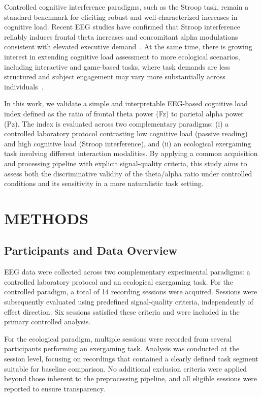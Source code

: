 \documentclass[letterpaper, 10 pt, conference]{ieeeconf}
\begin{document}
Controlled cognitive interference paradigms, such as the Stroop task, remain a standard benchmark for eliciting robust and well-characterized increases in cognitive load. Recent EEG studies have confirmed that Stroop interference reliably induces frontal theta increases and concomitant alpha modulations consistent with elevated executive demand~\cite{c5,c9}. At the same time, there is growing interest in extending cognitive load assessment to more ecological scenarios, including interactive and game-based tasks, where task demands are less structured and subject engagement may vary more substantially across individuals~\cite{c2,c3}.

In this work, we validate a simple and interpretable EEG-based cognitive load index defined as the ratio of frontal theta power (Fz) to parietal alpha power (Pz). The index is evaluated across two complementary paradigms: (i) a controlled laboratory protocol contrasting low cognitive load (passive reading) and high cognitive load (Stroop interference), and (ii) an ecological exergaming task involving different interaction modalities. By applying a common acquisition and processing pipeline with explicit signal-quality criteria, this study aims to assess both the discriminative validity of the theta/alpha ratio under controlled conditions and its sensitivity in a more naturalistic task setting.



\section{METHODS}

\subsection{Participants and Data Overview}
EEG data were collected across two complementary experimental paradigms: a controlled laboratory protocol and an ecological exergaming task. For the controlled paradigm, a total of 14 recording sessions were acquired. Sessions were subsequently evaluated using predefined signal-quality criteria, independently of effect direction. Six sessions satisfied these criteria and were included in the primary controlled analysis. 

For the ecological paradigm, multiple sessions were recorded from several participants performing an exergaming task. Analysis was conducted at the session level, focusing on recordings that contained a clearly defined task segment suitable for baseline comparison. No additional exclusion criteria were applied beyond those inherent to the preprocessing pipeline, and all eligible sessions were reported to ensure transparency.
\end{document}
